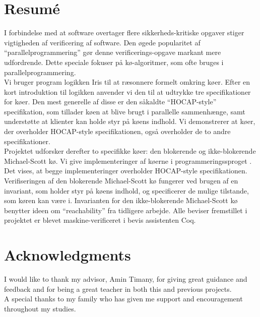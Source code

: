 \documentclass[a4paper, 10pt]{report}
\theoremstyle{definition}
\begin{document}

\chapter*{Resum\'e}

I forbindelse med at software overtager flere sikkerheds-kritiske opgaver stiger vigtigheden af verificering af software. Den øgede popularitet af ``parallelprogrammering'' gør denne verificerings-opgave markant mere udfordrende. Dette speciale fokuser på kø-algoritmer, som ofte bruges i parallelprogrammering.\\
Vi bruger program logikken Iris til at ræsonnere formelt omkring køer. Efter en kort introduktion til logikken anvender vi den til at udtrykke tre specifikationer for køer. Den mest generelle af disse er den såkaldte ``HOCAP-style'' specifikation, som tillader køen at blive brugt i parallelle sammenhænge, samt understøtte at klienter kan holde styr på køens indhold. Vi demonstrerer at køer, der overholder HOCAP-style specifikationen, også overholder de to andre specifikationer.\\
Projektet udforsker derefter to specifikke køer: den blokerende og ikke-blokerende Michael-Scott kø. Vi give implementeringer af køerne i programmeringssproget \heaplang{}. Det vises, at begge implementeringer overholder HOCAP-style specifikationen. Verifiseringen af den blokerende Michael-Scott kø fungerer ved brugen af en invariant, som holder styr på køens indhold, og specificerer de mulige tilstande, som køren kan være i. Invarianten for den ikke-blokerende Michael-Scott kø benytter ideen om ``reachability'' fra tidligere arbejde. Alle beviser fremstillet i projektet er blevet maskine-verificeret i bevis assistenten Coq.


\chapter*{Acknowledgments}

I would like to thank my advisor, Amin Timany, for giving great guidance and feedback and for being a great teacher in both this and previous projects.\\
A special thanks to my family who has given me support and encouragement throughout my studies.
\end{document}
